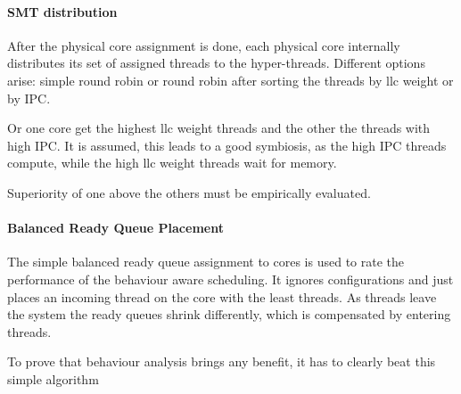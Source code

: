 \paragraph{SMT distribution}
After the physical core assignment is done, each physical core internally
distributes its set of assigned threads to the hyper-threads.
Different options arise: simple round robin or round robin after sorting the
threads by \gls{llc} weight or by IPC.

Or one core get the highest \gls{llc} weight threads and the other the threads
with high IPC.
It is assumed, this leads to a good symbiosis, as the high IPC threads compute,
while the high \gls{llc} weight threads wait for memory.

Superiority of one above the others must be empirically evaluated.


\paragraph{Balanced Ready Queue Placement}
The simple balanced ready queue assignment to cores is used to rate the
performance of the behaviour aware scheduling.
It ignores configurations and just places an incoming thread on the core with
the least threads.
As threads leave the system the ready queues shrink differently, which is
compensated by entering threads.

To prove that behaviour analysis brings any benefit, it has to clearly beat
this simple algorithm





